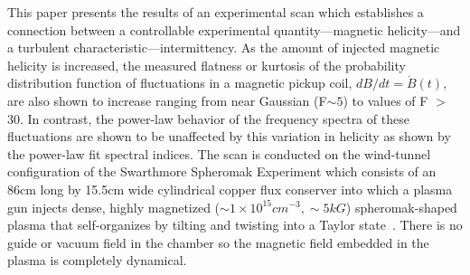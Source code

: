 \documentclass[aps,prl,amsmath,amssymb,reprint,superscriptaddress]{revtex4-1} %
\begin{document}

This paper presents the results of an experimental scan which establishes a connection between a controllable experimental quantity---magnetic helicity---and a turbulent characteristic---intermittency. As the amount of injected magnetic helicity is increased, the measured flatness or kurtosis of the probability distribution function of fluctuations in a magnetic pickup coil, $dB/dt = \dot{B}(t)$, are also shown to increase ranging from near Gaussian (F$\sim 5$) to values of F $>$ 30. In contrast, the power-law behavior of the frequency spectra of these fluctuations are shown to be unaffected by this variation in helicity as shown by the power-law fit spectral indices. The scan is conducted on the wind-tunnel configuration of the Swarthmore Spheromak Experiment which consists of an 86cm long by 15.5cm wide cylindrical copper flux conserver into which a plasma gun injects dense, highly magnetized ($\sim 1\times 10^{15} cm^{-3}, \sim 5kG$) spheromak-shaped plasma that self-organizes by tilting and twisting into a Taylor state~\cite{Gray13,Matthaeus80,Taylor86}. There is no guide or vacuum field in the chamber so the magnetic field embedded in the plasma is completely dynamical. 
\end{document}

